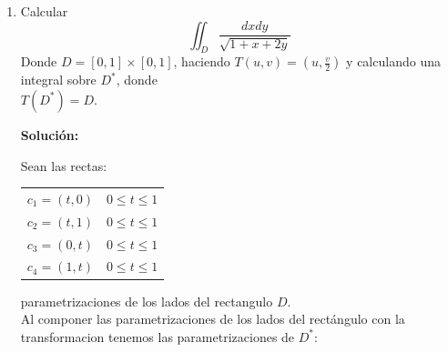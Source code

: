 \documentclass[10pt,letterpaper,fleqn]{article}
\begin{document}
\begin{enumerate}
\begin{minipage}[t]{0.5\textwidth}
            \end{minipage}
            \begin{minipage}[t]{0.5\textwidth}
                \vspace{0.5cm}
                $\iint_D{(x-y)}\,dxdy = \\
                \int_0^4 \int_{\frac{u}{2}+3}^{\frac{u}{2}+6} (4u-2u-3v)(12)\,dvdu = \\
                12\int_0^4 \int_{\frac{u}{2}+3}^{\frac{u}{2}+6} (2u-3v)\,dvdu =  \\
                12\int_0^4 (2uv-\frac{3v^2}{2})\big|_{\frac{u}{2}+3}^{\frac{u}{2}+6}\,du =  \\
                12\int_0^4 \frac{1}{2}(39u+135)\,du \\
                6(\frac{39u^2}{2}+135u)\big|_0^4 = \\
                6(\frac{39*16}{2}+135*4) = \\
                6(\frac{624}{2}+540) = \\
                6(312+540) = \\
                6(852) = \\
                5112$

                \vspace{1cm}

            \end{minipage}
        
        \item Calcular
            $$ \iint_D{\frac{dxdy}{\sqrt{1+x+2y}}}$$
            Donde $D=[0,1] \times [0,1]$, haciendo $T(u,v) = (u,\frac{v}{2})$ y calculando una integral sobre $D^*$, donde \\ $T(D^*)=D$.

            \textbf{Solución:}

            Sean las rectas:

            \begin{tabular}{ll}
                $c_1 = (t,0)$ & $0 \leq t \leq 1$ \\
                $c_2 = (t,1)$ & $0 \leq t \leq 1$ \\
                $c_3 = (0,t)$ & $0 \leq t \leq 1$ \\
                $c_4 = (1,t)$ & $0 \leq t \leq 1$ \\
            \end{tabular}

            parametrizaciones de los lados del rectangulo $D$. \\
            Al componer las parametrizaciones de los lados del rectángulo con la transformacion tenemos las parametrizaciones de $D^*$:


\end{enumerate}
\end{document}
